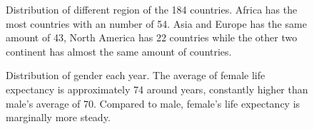 \documentclass[
  letterpaper,
  DIV=11,
  numbers=noendperiod]{scrartcl}
\begin{document}
\begin{figure}


\caption{\label{fig-region}Distribution of different region of the 184
countries. Africa has the most countries with an number of 54. Asia and
Europe has the same amount of 43, North America has 22 countries while
the other two continent has almost the same amount of countries.}

\end{figure}%

\begin{figure}


\caption{\label{fig-gender}Distribution of gender each year. The average
of female life expectancy is approximately 74 around years, constantly
higher than male's average of 70. Compared to male, female's life
expectancy is marginally more steady.}

\end{figure}%
\end{document}

